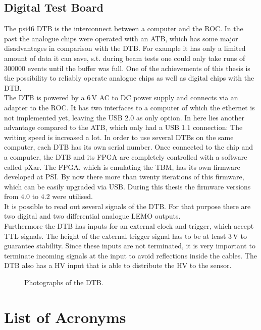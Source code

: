 \documentclass[british,11pt,a4paper]{memoir}
\begin{document}
\section{Digital Test Board}\label{sdtb}
The psi46 \ac{DTB} is the interconnect between a computer and the \ac{ROC}. In the past the analogue chips were operated with an \ac{ATB}, which has some major disadvantages in comparison with the \ac{DTB}. For example it has only a limited amount of data it can save, s.t. during beam tests one could only take runs of $300000$ events until the buffer was full. One of the achievements of this thesis is the possibility to reliably operate analogue chips as well as digital chips with the \ac{DTB}.\\
The \ac{DTB} is powered by a $6\,$V AC to DC power supply and connects via an adapter to the \ac{ROC}. It has two interfaces to a computer of which the ethernet is not implemented yet, leaving the USB 2.0 as only option. In here lies another advantage compared to the \ac{ATB}, which only had a USB 1.1 connection: The writing speed is increased a lot. In order to use several \ac{DTB}s on the same computer, each \ac{DTB} has its own serial number. Once connected to the chip and a computer, the \ac{DTB} and its \ac{FPGA} are completely controlled with a software called pXar. The \ac{FPGA}, which is emulating the \ac{TBM}, has its own firmware developed at \ac{PSI}. By now there more than twenty iterations of this firmware, which can be easily upgraded via USB. During this thesis the firmware versions from $4.0$ to $4.2$ were utilised.\\
It is possible to read out several signals of the \ac{DTB}. For that purpose there are two digital and two differential analogue LEMO outputs.\\
Furthermore the \ac{DTB} has inputs for an external clock and trigger, which accept \ac{TTL} signals. The height of the external trigger signal has to be at least $3\,$V to guarantee stability. Since these inputs are not terminated, it is very important to terminate incoming signals at the input to avoid reflections inside the cables. The \ac{DTB} also has a \ac{HV} input that is able to distribute the \ac{HV} to the sensor.
\begin{figure}[ht]
	\centering
	\hfill
	\caption{Photographs of the \ac{DTB}.}
	\label{pdtb}
\end{figure}\no
\chapter*{List of Acronyms}



\end{document}
